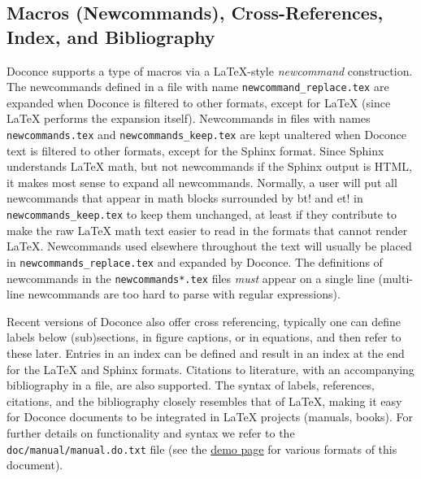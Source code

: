 \documentclass[%
oneside,                 %
final,                   %
10pt]{article}
\begin{document}
\subsection{Macros (Newcommands), Cross-References, Index, and Bibliography}

\label{newcommands}

Doconce supports a type of macros via a LaTeX-style \emph{newcommand}
construction.  The newcommands defined in a file with name
{\fontsize{10pt}{10pt}\Verb!newcommand_replace.tex!} are expanded when Doconce is filtered to
other formats, except for {\LaTeX} (since {\LaTeX} performs the expansion
itself).  Newcommands in files with names {\fontsize{10pt}{10pt}\Verb!newcommands.tex!} and
{\fontsize{10pt}{10pt}\Verb!newcommands_keep.tex!} are kept unaltered when Doconce text is
filtered to other formats, except for the Sphinx format. Since Sphinx
understands {\LaTeX} math, but not newcommands if the Sphinx output is
HTML, it makes most sense to expand all newcommands.  Normally, a user
will put all newcommands that appear in math blocks surrounded by
{\fontsize{10pt}{10pt}\Verb!!bt!} and {\fontsize{10pt}{10pt}\Verb!!et!} in {\fontsize{10pt}{10pt}\Verb!newcommands_keep.tex!} to keep them unchanged, at
least if they contribute to make the raw {\LaTeX} math text easier to
read in the formats that cannot render {\LaTeX}.  Newcommands used
elsewhere throughout the text will usually be placed in
{\fontsize{10pt}{10pt}\Verb!newcommands_replace.tex!} and expanded by Doconce.  The definitions of
newcommands in the {\fontsize{10pt}{10pt}\Verb!newcommands*.tex!} files \emph{must} appear on a single
line (multi-line newcommands are too hard to parse with regular
expressions).

Recent versions of Doconce also offer cross referencing, typically one
can define labels below (sub)sections, in figure captions, or in
equations, and then refer to these later. Entries in an index can be
defined and result in an index at the end for the {\LaTeX} and Sphinx
formats. Citations to literature, with an accompanying bibliography in
a file, are also supported. The syntax of labels, references,
citations, and the bibliography closely resembles that of {\LaTeX},
making it easy for Doconce documents to be integrated in {\LaTeX}
projects (manuals, books). For further details on functionality and
syntax we refer to the {\fontsize{10pt}{10pt}\Verb!doc/manual/manual.do.txt!} file (see the
\href{{https://doconce.googlecode.com/hg/doc/demos/manual/index.html}}{demo page}
for various formats of this document).
\end{document}
